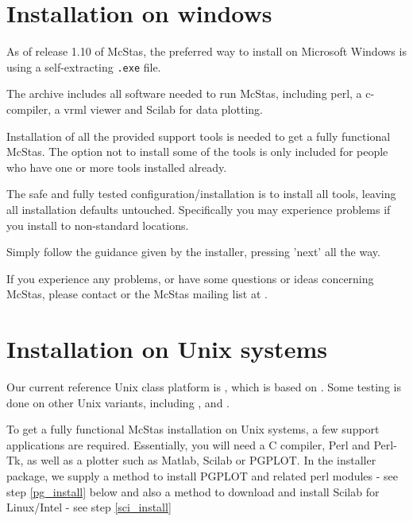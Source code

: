 \section{Installation on windows}
\label{s:win32_install}
As of release 1.10 of McStas, the preferred way to install on
Microsoft Windows is using a self-extracting \texttt{.exe} file.

\noindent The archive includes all software needed to run McStas, including perl, a
c-compiler, a vrml viewer and Scilab for data plotting.

\noindent Installation of all the provided support tools is needed to get a fully
functional McStas. The option not to install some of the tools is only
included for people who have one or more tools installed already.

\noindent The safe and fully tested configuration/installation is to install all
tools, leaving all installation defaults untouched. Specifically you
may experience problems if you install to non-standard locations. 

\noindent Simply follow the guidance given by the installer, pressing 'next' all
the way.

\noindent If you experience any problems, or have some questions or ideas
concerning McStas, please contact
or the McStas mailing list at .


\section{Installation on Unix systems}
\label{s:unix_install}
Our current reference Unix class platform is
, which is
based on . Some testing is done on other
Unix variants, including ,
and .


\noindent To get a fully functional McStas installation on Unix systems, a few support
applications are required. Essentially, you will need a C compiler,
Perl and Perl-Tk, as well as a plotter such as Matlab, Scilab or
PGPLOT. In the installer package, we supply a method to install PGPLOT
and related perl modules - see step \ref{pg_install} below and also
a method to download and install Scilab for Linux/Intel - see step \ref{sci_install}

